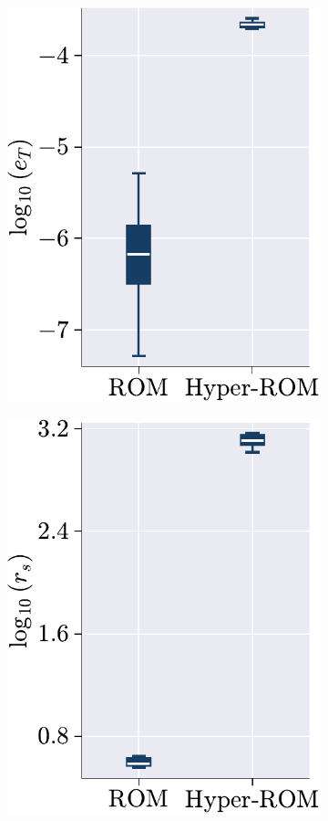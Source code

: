\documentclass[11pt]{article}
\begin{document}
            \begin{figure}[t]
                \centering
                \begin{subfigure}[b]{0.47\linewidth}
                    \centering
                    \includegraphics[height=0.95\linewidth]{error_comp_rom_hrom_ecsw.pdf}
                    \caption{}
                    \label{fig:HROM_ERROR_SPDUP_a}
                \end{subfigure}\hfill
                \begin{subfigure}[b]{0.47\linewidth}
                    \centering
                    \includegraphics[height=0.95\linewidth]{speed_up_comp_rom_hrom_ecsw.pdf}

\end{subfigure}
\end{figure}
\end{document}
